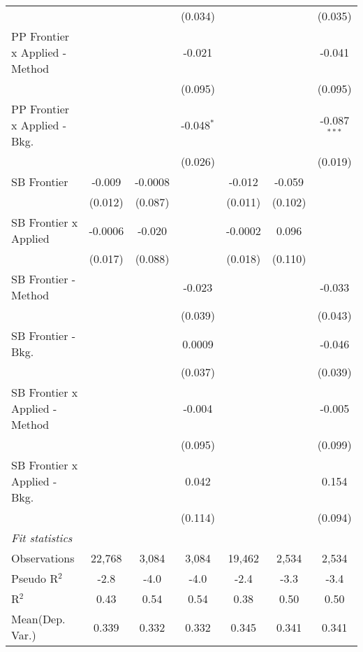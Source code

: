 \begin{tabular}{lcccccc}
                                  &               &         & (0.034)      &               &         & (0.035)\\   
   PP Frontier x Applied - Method &               &         & -0.021       &               &         & -0.041\\   
                                  &               &         & (0.095)      &               &         & (0.095)\\   
   PP Frontier x Applied - Bkg.   &               &         & -0.048$^{*}$ &               &         & -0.087$^{***}$\\   
                                  &               &         & (0.026)      &               &         & (0.019)\\   
   SB Frontier                    & -0.009        & -0.0008 &              & -0.012        & -0.059  &   \\   
                                  & (0.012)       & (0.087) &              & (0.011)       & (0.102) &   \\   
   SB Frontier x Applied          & -0.0006       & -0.020  &              & -0.0002       & 0.096   &   \\   
                                  & (0.017)       & (0.088) &              & (0.018)       & (0.110) &   \\   
   SB Frontier - Method           &               &         & -0.023       &               &         & -0.033\\   
                                  &               &         & (0.039)      &               &         & (0.043)\\   
   SB Frontier - Bkg.             &               &         & 0.0009       &               &         & -0.046\\   
                                  &               &         & (0.037)      &               &         & (0.039)\\   
   SB Frontier x Applied - Method &               &         & -0.004       &               &         & -0.005\\   
                                  &               &         & (0.095)      &               &         & (0.099)\\   
   SB Frontier x Applied - Bkg.   &               &         & 0.042        &               &         & 0.154\\   
                                  &               &         & (0.114)      &               &         & (0.094)\\   
   \midrule
   \emph{Fit statistics}\\
   Observations                   & 22,768        & 3,084   & 3,084        & 19,462        & 2,534   & 2,534\\  
   Pseudo R$^2$                   & -2.8          & -4.0    & -4.0         & -2.4          & -3.3    & -3.4\\  
   R$^2$                          & 0.43          & 0.54    & 0.54         & 0.38          & 0.50    & 0.50\\  
Mean(Dep. Var.) & 0.339 & 0.332 & 0.332 & 0.345 & 0.341 & 0.341 \\
   

\end{tabular}
